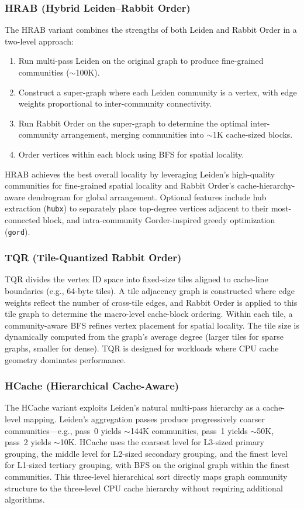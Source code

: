 \documentclass[sigconf, nonacm]{acmart}
\begin{document}
\subsubsection{HRAB (Hybrid Leiden--Rabbit Order)}
\label{sec:hrab}
The HRAB variant combines the strengths of both Leiden and Rabbit Order in a two-level approach:
\begin{enumerate}[topsep=0pt,itemsep=1pt]
\item Run multi-pass Leiden on the original graph to produce fine-grained communities (${\sim}$100K).
\item Construct a super-graph where each Leiden community is a vertex, with edge weights proportional to inter-community connectivity.
\item Run Rabbit Order on the super-graph to determine the optimal inter-community arrangement, merging communities into ${\sim}$1K cache-sized blocks.
\item Order vertices within each block using BFS for spatial locality.
\end{enumerate}
HRAB achieves the best overall locality by leveraging Leiden's high-quality communities for fine-grained spatial locality and Rabbit Order's cache-hierarchy-aware dendrogram for global arrangement. Optional features include hub extraction (\texttt{hubx}) to separately place top-degree vertices adjacent to their most-connected block, and intra-community Gorder-inspired greedy optimization (\texttt{gord}).

\subsubsection{TQR (Tile-Quantized Rabbit Order)}
TQR divides the vertex ID space into fixed-size tiles aligned to cache-line boundaries (e.g., 64-byte tiles). A tile adjacency graph is constructed where edge weights reflect the number of cross-tile edges, and Rabbit Order is applied to this tile graph to determine the macro-level cache-block ordering. Within each tile, a community-aware BFS refines vertex placement for spatial locality. The tile size is dynamically computed from the graph's average degree (larger tiles for sparse graphs, smaller for dense). TQR is designed for workloads where CPU cache geometry dominates performance.

\subsubsection{HCache (Hierarchical Cache-Aware)}
The HCache variant exploits Leiden's natural multi-pass hierarchy as a cache-level mapping. Leiden's aggregation passes produce progressively coarser communities---e.g., pass~0 yields ${\sim}$144K communities, pass~1 yields ${\sim}$50K, pass~2 yields ${\sim}$10K. HCache uses the coarsest level for L3-sized primary grouping, the middle level for L2-sized secondary grouping, and the finest level for L1-sized tertiary grouping, with BFS on the original graph within the finest communities. This three-level hierarchical sort directly maps graph community structure to the three-level CPU cache hierarchy without requiring additional algorithms.
\end{document}
